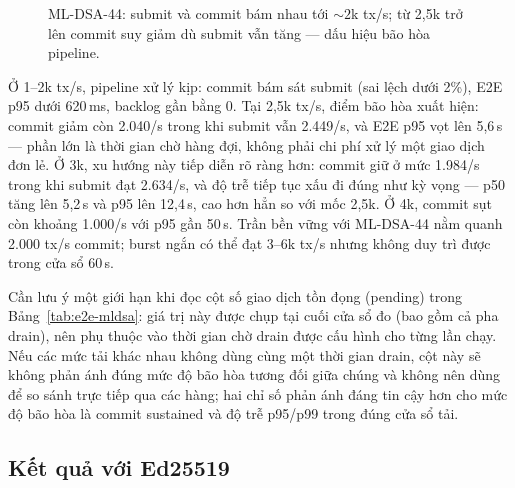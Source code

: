 \begin{figure}[H]
\centering
{}
\caption{ML-DSA-44: submit và commit bám nhau tới ${\sim}2$k tx/s; từ 2,5k trở
lên commit suy giảm dù submit vẫn tăng --- dấu hiệu bão hòa pipeline.}
\label{fig:e2e-mldsa}
\end{figure}

Ở 1--2k tx/s, pipeline xử lý kịp: commit bám sát submit (sai lệch dưới 2\%),
E2E p95 dưới 620\,ms, backlog gần bằng 0. Tại 2,5k tx/s, điểm bão hòa xuất
hiện: commit giảm còn 2.040/s trong khi submit vẫn 2.449/s, và E2E p95 vọt
lên 5,6\,s --- phần lớn là thời gian chờ hàng đợi, không phải chi phí xử lý
một giao dịch đơn lẻ. Ở 3k, xu hướng này tiếp diễn rõ ràng hơn: commit giữ ở
mức 1.984/s trong khi submit đạt 2.634/s, và độ trễ tiếp tục xấu đi đúng như
kỳ vọng --- p50 tăng lên 5,2\,s và p95 lên 12,4\,s, cao hơn hẳn so với mốc
2,5k. Ở 4k, commit sụt còn khoảng 1.000/s với p95 gần 50\,s. Trần bền vững
với ML-DSA-44 nằm quanh 2.000 tx/s commit; burst ngắn có thể đạt 3--6k tx/s
nhưng không duy trì được trong cửa sổ 60\,s.

Cần lưu ý một giới hạn khi đọc cột số giao dịch tồn đọng (pending) trong
Bảng~\ref{tab:e2e-mldsa}: giá trị này được chụp tại cuối cửa sổ đo (bao gồm cả
pha drain), nên phụ thuộc vào thời gian chờ drain được cấu hình cho từng lần
chạy. Nếu các mức tải khác nhau không dùng cùng một thời gian drain, cột này
sẽ không phản ánh đúng mức độ bão hòa tương đối giữa chúng và không nên dùng
để so sánh trực tiếp qua các hàng; hai chỉ số phản ánh đáng tin cậy hơn cho
mức độ bão hòa là commit sustained và độ trễ p95/p99 trong đúng cửa sổ tải.

\subsection{Kết quả với Ed25519}
\label{sec:e2e-ed25519}

